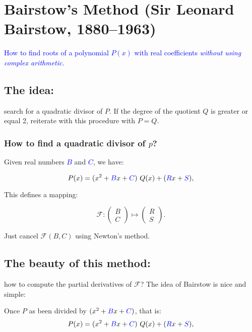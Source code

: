 \documentclass[11pt]{amsart}
\begin{document}
  \section*{Bairstow's Method (Sir Leonard Bairstow,
    1880--1963)}

  \begin{center}
    \textcolor{blue}{\large How to find roots of a polynomial  $P(x)$
      with real coefficients 
        \emph{without using complex arithmetic.}}
  \end{center}
   \subsection*{The idea:}    

  search for a quadratic divisor of $P$. If the degree of the quotient $Q$
  is greater or equal 2, reiterate with this procedure with $P=Q$.

  \subsubsection*{How to find a quadratic divisor of $p$?} 
 

  Given real numbers \textcolor{blue}{$B$} and \textcolor{blue}{$C$},
  we have:

  $$P(x)= (x^2+\textcolor{blue}{B}x+\textcolor{blue}{C})\ Q(x)+ (\textcolor{blue}{R}x+\textcolor{blue}{S}),$$

  This defines a mapping:
  
$$\mathcal{F}: \begin{pmatrix}B \\ C  \end{pmatrix}
\mapsto  \begin{pmatrix}R\\S\end{pmatrix}.$$

  Just cancel $\mathcal{F}(B,C)$ using Newton's method.

  \subsection*{The beauty of this method:}
  
how to compute the partial derivatives of  $\mathcal{F}$? The idea of
Bairstow is  nice and simple:

Once $P$ as been divided by
$(x^2+\textcolor{blue}{B}x+\textcolor{blue}{C})$, that is:
$$P(x)= (x^2+\textcolor{blue}{B}x+\textcolor{blue}{C})\ Q(x)+ (\textcolor{blue}{R}x+\textcolor{blue}{S}),$$
\end{document}
